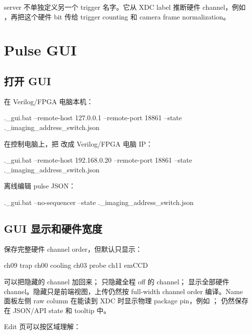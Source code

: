 \documentclass[11pt,oneside,openany]{book}
\begin{document}
server 不单独定义另一个 trigger 名字。它从 XDC label 推断硬件 channel，例如 ，再把这个硬件 bit 传给 trigger counting 和 camera frame normalization。

\chapter{Pulse GUI}
\section{打开 GUI}
在 Verilog/FPGA 电脑本机：

\begin{codeblock}[PowerShell]
.\pulse_gui.bat --remote-host 127.0.0.1 --remote-port 18861 --state .\pulses\camera_imaging_address_switch.json
\end{codeblock}

在控制电脑上，把  改成 Verilog/FPGA 电脑 IP：

\begin{codeblock}[PowerShell]
.\pulse_gui.bat --remote-host 192.168.0.20 --remote-port 18861 --state .\pulses\camera_imaging_address_switch.json
\end{codeblock}

离线编辑 pulse JSON：

\begin{codeblock}[PowerShell]
.\pulse_gui.bat --no-sequencer --state .\pulses\camera_imaging_address_switch.json
\end{codeblock}

\section{GUI 显示和硬件宽度}
 保存完整硬件 channel order，但默认只显示：

\begin{codeblock}
ch09 trap
ch00 cooling
ch03 probe
ch11 emCCD
\end{codeblock}

 可以把隐藏的 channel 加回来； 只隐藏全程 off 的 channel； 显示全部硬件 channel。隐藏只是前端视图，上传仍然按 full-width channel order 编译。Name 面板左侧 raw column 在能读到 XDC 时显示物理 package pin，例如 ； 仍然保存在 JSON/API state 和 tooltip 中。

Edit 页可以按区域理解：
\end{document}
